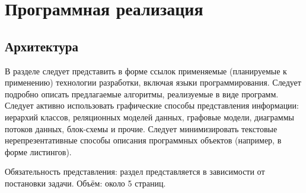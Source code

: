 \chapter{Программная реализация}\label{chap3_soft_architecture}
\section{Архитектура}

В разделе следует представить в форме ссылок применяемые (планируемые к применению) технологии разработки, включая языки программирования. Следует подробно описать предлагаемые алгоритмы, реализуемые в виде программ. Следует активно использовать графические способы представления информации: иерархий классов, реляционных моделей данных, графовые модели, диаграммы потоков данных, блок-схемы и прочие. Следует минимизировать текстовые нерепрезентативные способы описания программных объектов (например, в форме листингов).

Обязательность представления: раздел представляется в зависимости от постановки задачи.
Объём: около 5 страниц.




